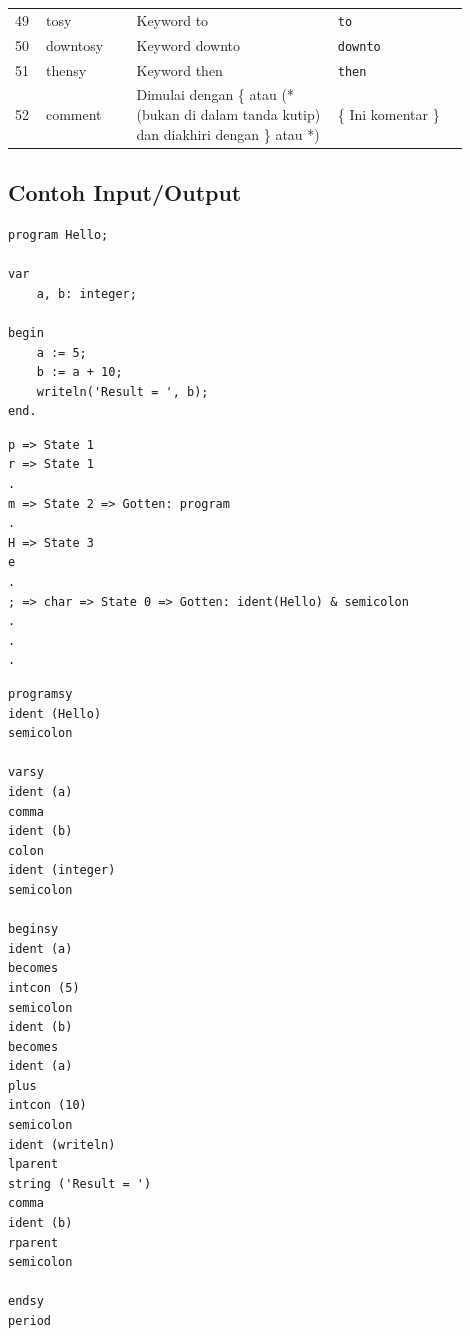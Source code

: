 \begin{center}
\begin{longtable}{p{0.06\linewidth} p{0.18\linewidth} p{0.40\linewidth} p{0.26\linewidth}}
        49 & tosy        & Keyword to                                                                                                                  & \texttt{to}                    \\
        50 & downtosy    & Keyword downto                                                                                                              & \texttt{downto}                \\
        51 & thensy      & Keyword then                                                                                                                & \texttt{then}                  \\
        52 & comment     & Dimulai dengan  \{ atau (* (bukan di dalam tanda kutip) dan diakhiri dengan \} atau *)                                      & {\ttfamily \{ Ini komentar \}}
    \end{longtable}
\end{center}

\subsection{Contoh Input/Output}

\begin{tcolorbox}[title=Input,colback=gray!5,colframe=black!60,boxrule=0.5pt,arc=2mm,breakable]
    \begin{verbatim}
program Hello;

var
    a, b: integer;

begin
    a := 5;
    b := a + 10;
    writeln('Result = ', b);
end.
\end{verbatim}
\end{tcolorbox}


\begin{tcolorbox}[title=Visualisasi Pemrosesan (DFA),colback=gray!5,colframe=black!60,boxrule=0.5pt,arc=2mm,breakable]
    \begin{verbatim}
p => State 1
r => State 1
.
m => State 2 => Gotten: program
.
H => State 3
e
.
; => char => State 0 => Gotten: ident(Hello) & semicolon
.
.
.
\end{verbatim}
\end{tcolorbox}

\begin{tcolorbox}[title=Output,colback=gray!5,colframe=black!60,boxrule=0.5pt,arc=2mm,breakable]
    \begin{verbatim}
programsy
ident (Hello)
semicolon

varsy
ident (a)
comma
ident (b)
colon
ident (integer)
semicolon

beginsy
ident (a)
becomes
intcon (5)
semicolon
ident (b)
becomes
ident (a)
plus
intcon (10)
semicolon
ident (writeln)
lparent
string ('Result = ')
comma
ident (b)
rparent
semicolon

endsy
period
\end{verbatim}
\end{tcolorbox}


